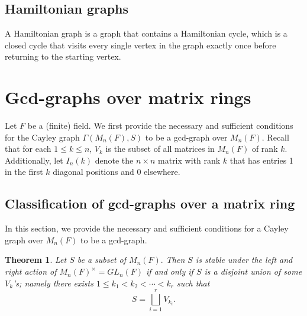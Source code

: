 \documentclass[12pt, a4paper]{amsart}
\newtheorem{thm}{Theorem}[section]
\theoremstyle{definition}
\numberwithin{equation}{section}
\begin{document}
\subsection{Hamiltonian graphs}
A Hamiltonian graph is a graph that contains a Hamiltonian cycle, which is a closed cycle that visits every single vertex in the graph exactly once before returning to the starting vertex.

\section{Gcd-graphs over matrix rings} \label{sec:gcd-graphs}
Let $F$ be a (finite) field. We first provide the necessary and sufficient conditions for the Cayley graph $\Gamma(M_n(F),S)$ to be a gcd-graph over $M_n(F).$ Recall that for each $1 \leq k \leq n$, $V_k$ is the subset of all matrices in $M_n(F)$ of rank $k.$ Additionally, let $I_n(k)$ denote the $n \times n$ matrix with rank $k$ that has entries 1 in the first $k$ diagonal positions and 0 elsewhere.

\subsection{Classification of gcd-graphs over a matrix ring} \label{subsec:classification}
In this section, we provide the necessary and sufficient conditions for a Cayley graph over $M_n(F)$ to be a gcd-graph. 

\begin{thm}
    Let $S$ be a subset of $M_n(F).$ Then $S$ is stable under the left and right action of $M_n(F)^{\times} = GL_n(F)$ if and only if $S$ is a disjoint union of some $V_k$'s; namely there exists $1 \leq k_1 < k_2 < \cdots <k_r$ such that 
    \[ S= \bigsqcup_{i=1}^r V_{k_i}.\]
\end{thm}
\end{document}
